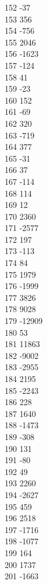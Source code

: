 { 152	-37 \\
 153	356 \\
 154	-756 \\
 155	2046 \\
 156	-1623 \\
 157	-124 \\
 158	41 \\
 159	-23 \\
 160	152 \\
 161	-69 \\
 162	320 \\
 163	-719 \\
 164	377 \\
 165	-31 \\
 166	37 \\
 167	-114 \\
 168	114 \\
 169	12 \\
 170	2360 \\
 171	-2577 \\
 172	197 \\
 173	-113 \\
 174	84 \\
 175	1979 \\
 176	-1999 \\
 177	3826 \\
 178	9028 \\
 179	-12909 \\
 180	53 \\
 181	11863 \\
 182	-9002 \\
 183	-2955 \\
 184	2195 \\
 185	-2243 \\
 186	228 \\
 187	1640 \\
 188	-1473 \\
 189	-308 \\
 190	131 \\
 191	-80 \\
 192	49 \\
 193	2260 \\
 194	-2627 \\
 195	459 \\
 196	2518 \\
 197	-1716 \\
 198	-1077 \\
 199	164 \\
 200	1737 \\
 201	-1663 \\
}
